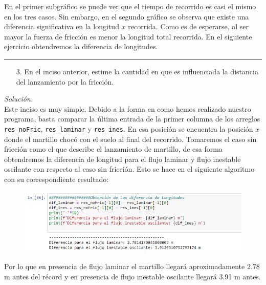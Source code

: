 \documentclass[11pt]{article}
\begin{document}
	En el primer subgráfico se puede ver que el tiempo de recorrido es casi el mismo en los tres casos. Sin embargo, en el segundo gráfico se observa que existe una diferencia significativa en la longitud $x$ recorrida. Como es de esperarse, al ser mayor la fuerza de fricción es menor la longitud total recorrida. En el siguiente ejercicio obtendremos la diferencia de longitudes.
\hrule
\newpage
	\begin{enumerate}
		\item [3.] En el inciso anterior, estime la cantidad en que es influenciada la distancia del lanzamiento por la fricción. 
	\end{enumerate}
	\textit{Solución.}\\
	Este inciso es muy simple. Debido a la forma en como hemos realizado nuestro programa, basta comparar la última entrada de la primer columna de los arreglos \texttt{res\_noFric}, \texttt{res\_laminar} y \texttt{res\_ines}. En esa posición se encuentra la posición $x$ donde el martillo chocó con el suelo al final del recorrido. Tomaremos el caso sin fricción como el que describe el lanzamiento de martillo, de esa forma obtendremos la diferencia de longitud para el flujo laminar y flujo inestable oscilante con respecto al caso sin fricción. Esto se hace en el siguiente algoritmo con su correspondiente resultado:
	 \begin{figure}[h!]
	 	\centering
	 	\includegraphics[width=14cm]{Img/13.PNG}
	 \end{figure}
 
 	Por lo que en presencia de flujo laminar el martillo llegará aproximadamente 2.78 m antes del récord y en presencia de flujo inestable oscilante llegará 3.91 m antes.
\end{document}
